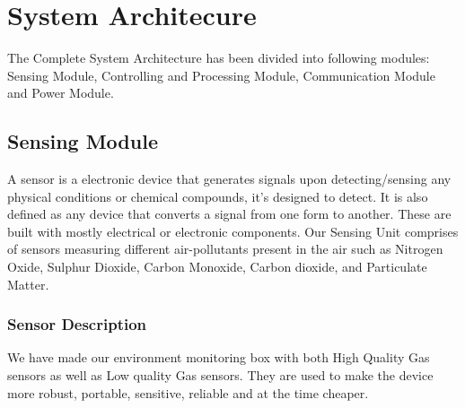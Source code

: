 \chapter{System Architecure} %

\label{Chapter3} %

The Complete System Architecture has been divided into following modules: Sensing Module, Controlling and Processing Module, Communication Module and Power Module.

\section{Sensing Module}
A sensor is a electronic device that generates signals upon detecting/sensing any physical conditions or chemical compounds, it's designed to detect. It is also defined as any device that converts a signal from one form to another. These are built with mostly electrical or electronic components. Our Sensing Unit comprises of sensors measuring different air-pollutants present in the air such as Nitrogen Oxide, Sulphur Dioxide, Carbon Monoxide, Carbon dioxide, and Particulate Matter.

\subsection{Sensor Description}
We have made our environment monitoring box with both High Quality Gas sensors as well as Low quality Gas sensors. They are used to make the device more robust, portable, sensitive, reliable and at the time cheaper.

